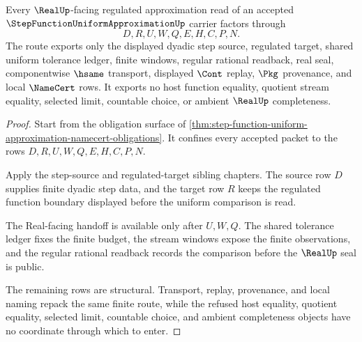 \begin{theorem}
\label{thm:step-function-uniform-approximation-regulated-route}
Every $\RealUp$-facing regulated approximation read of an accepted $\StepFunctionUniformApproximationUp$ carrier factors through
$$
D,R,U,W,Q,E,H,C,P,N .
$$
The route exports only the displayed dyadic step source, regulated target, shared uniform tolerance ledger, finite windows, regular rational readback, real seal, componentwise $\hsame$ transport, displayed $\Cont$ replay, $\Pkg$ provenance, and local $\NameCert$ rows. It exports no host function equality, quotient stream equality, selected limit, countable choice, or ambient $\RealUp$ completeness.
\end{theorem}
\begin{proof}
Start from the obligation surface of \autoref{thm:step-function-uniform-approximation-namecert-obligations}. It confines every accepted packet to the rows $D,R,U,W,Q,E,H,C,P,N$.

Apply the step-source and regulated-target sibling chapters. The source row $D$ supplies finite dyadic step data, and the target row $R$ keeps the regulated function boundary displayed before the uniform comparison is read.

The Real-facing handoff is available only after $U,W,Q$. The shared tolerance ledger fixes the finite budget, the stream windows expose the finite observations, and the regular rational readback records the comparison before the $\RealUp$ seal is public.

The remaining rows are structural. Transport, replay, provenance, and local naming repack the same finite route, while the refused host equality, quotient equality, selected limit, countable choice, and ambient completeness objects have no coordinate through which to enter.
\end{proof}


